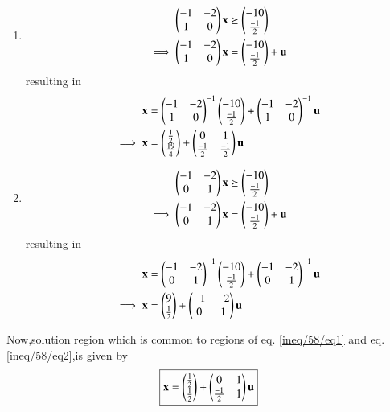 \begin{enumerate}
    \item 
    \begin{align}
        \begin{pmatrix}-1 & -2 \\ 1 & 0\end{pmatrix}\mathbf{x} &\succeq \begin{pmatrix}-10 \\ \frac{-1}{2}\end{pmatrix}
        \\
        \implies  \begin{pmatrix}-1 & -2 \\ 1 & 0\end{pmatrix}\mathbf{x} &= \begin{pmatrix}-10 \\ \frac{-1}{2}\end{pmatrix} + \mathbf{u}
    \end{align}
    resulting in 
    \begin{align}
        \mathbf{x} &= \begin{pmatrix}-1 & -2 \\ 1 & 0\end{pmatrix}^{-1}\begin{pmatrix}-10 \\\frac{-1}{2}\end{pmatrix} + \begin{pmatrix}-1 & -2 \\ 1 & 0\end{pmatrix}^{-1}\mathbf{u}
        \\
        \implies \mathbf{x} &= \begin{pmatrix}\frac{1}{2} \\ \frac{19}{4}\end{pmatrix} + \begin{pmatrix}0&1\\ \frac{-1}{2}&\frac{-1}{2}\end{pmatrix}\mathbf{u}   \label{ineq/58/eq1}
    \end{align}
    \item 
    \begin{align}
        \begin{pmatrix}-1& -2 \\ 0 & 1\end{pmatrix}\mathbf{x} &\succeq \begin{pmatrix}-10 \\ \frac{-1}{2}\end{pmatrix}
        \\
        \implies  \begin{pmatrix}-1& -2 \\ 0 & 1\end{pmatrix}\mathbf{x} &= \begin{pmatrix}-10 \\ \frac{-1}{2}\end{pmatrix} + \mathbf{u}
    \end{align}
    resulting in 
    \begin{align}
        \mathbf{x} &= \begin{pmatrix}-1& -2 \\ 0 & 1\end{pmatrix}^{-1}\begin{pmatrix}-10 \\ \frac{-1}{2}\end{pmatrix} + \begin{pmatrix}-1& -2 \\ 0 & 1\end{pmatrix}^{-1}\mathbf{u}
        \\
        \implies \mathbf{x} &= \begin{pmatrix}9\\\frac{1}{2}\end{pmatrix} + \begin{pmatrix}-1& -2 \\ 0 & 1\end{pmatrix}\mathbf{u} \label{ineq/58/eq2}
    \end{align}
\end{enumerate}
Now,solution region which is common to regions of eq. \eqref{ineq/58/eq1} and eq. \eqref{ineq/58/eq2},is given by
\begin{align}
    \boxed{\mathbf{x} = \begin{pmatrix}\frac{1}{2}\\\frac{1}{2}\end{pmatrix}+\begin{pmatrix}0&1\\\frac{-1}{2}&1\end{pmatrix}\mathbf{u}}
\end{align}
